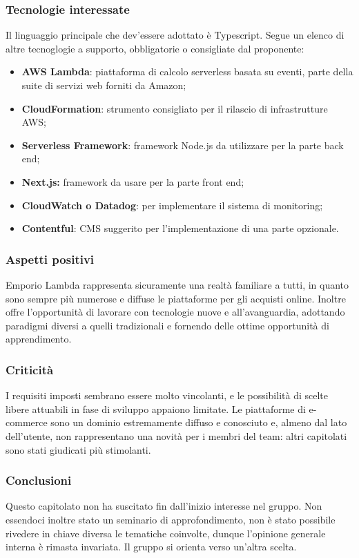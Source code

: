\subsubsection{Tecnologie interessate}

Il linguaggio principale che dev'essere adottato è Typescript. Segue un elenco di altre tecnoglogie a supporto, obbligatorie o consigliate dal proponente:
\begin{itemize}
    \item \textbf{AWS Lambda}: piattaforma di calcolo serverless basata su eventi, parte della suite di servizi web forniti da Amazon;
    \item \textbf{CloudFormation}: strumento consigliato per il rilascio di infrastrutture AWS;
    \item \textbf{Serverless Framework}: framework Node.js da utilizzare per la parte back end;
    \item \textbf{Next.js:} framework da usare per la parte front end;
    \item \textbf{CloudWatch o Datadog}: per implementare il sistema di monitoring;
    \item \textbf{Contentful}: CMS suggerito per l'implementazione di una parte opzionale.
\end{itemize}


\subsubsection{Aspetti positivi}

Emporio Lambda rappresenta sicuramente una realtà familiare a tutti, in quanto sono sempre più numerose e diffuse le piattaforme per gli acquisti online. Inoltre offre l'opportunità di lavorare con tecnologie nuove e all'avanguardia, adottando paradigmi diversi a quelli tradizionali e fornendo delle ottime opportunità di apprendimento.


\subsubsection{Criticità}

I requisiti imposti sembrano essere molto vincolanti, e le possibilità di scelte libere attuabili in fase di sviluppo appaiono limitate. Le piattaforme di e-commerce sono un dominio estremamente diffuso e conosciuto e, almeno dal lato dell'utente, non rappresentano una novità per i membri del team: altri capitolati sono stati giudicati più stimolanti.


\subsubsection{Conclusioni}

Questo capitolato non ha suscitato fin dall'inizio interesse nel gruppo. Non essendoci inoltre stato un seminario di approfondimento, non è stato possibile rivedere in chiave diversa le tematiche coinvolte, dunque l'opinione generale interna è rimasta invariata. Il gruppo si orienta verso un'altra scelta.




